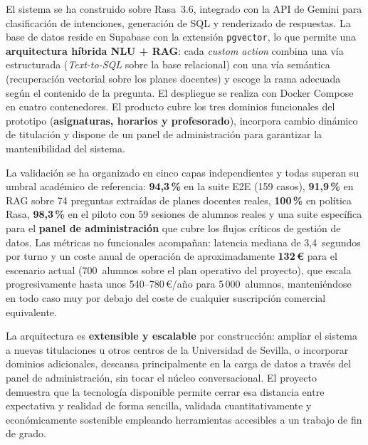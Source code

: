 El sistema se ha construido sobre Rasa~3.6, integrado con la API de Gemini para clasificación de intenciones, generación de SQL y renderizado de respuestas. La base de datos reside en Supabase con la extensión \texttt{pgvector}, lo que permite una \textbf{arquitectura híbrida NLU + RAG}: cada \textit{custom action} combina una vía estructurada (\textit{Text-to-SQL} sobre la base relacional) con una vía semántica (recuperación vectorial sobre los planes docentes) y escoge la rama adecuada según el contenido de la pregunta. El despliegue se realiza con Docker Compose en cuatro contenedores. El producto cubre los tres dominios funcionales del prototipo (\textbf{asignaturas, horarios y profesorado}), incorpora cambio dinámico de titulación y dispone de un panel de administración para garantizar la mantenibilidad del sistema.

La validación se ha organizado en cinco capas independientes y todas superan su umbral académico de referencia: \textbf{94,3\,\%} en la suite E2E (159 casos), \textbf{91,9\,\%} en RAG sobre 74 preguntas extraídas de planes docentes reales, \textbf{100\,\%} en política Rasa, \textbf{98,3\,\%} en el piloto con 59 sesiones de alumnos reales y una suite específica para el \textbf{panel de administración} que cubre los flujos críticos de gestión de datos. Las métricas no funcionales acompañan: latencia mediana de 3,4~segundos por turno y un coste anual de operación de aproximadamente \textbf{132\,€} para el escenario actual (700~alumnos sobre el plan operativo del proyecto), que escala progresivamente hasta unos 540--780\,€/año para 5\,000~alumnos, manteniéndose en todo caso muy por debajo del coste de cualquier suscripción comercial equivalente.

La arquitectura es \textbf{extensible y escalable} por construcción: ampliar el sistema a nuevas titulaciones u otros centros de la Universidad de Sevilla, o incorporar dominios adicionales, descansa principalmente en la carga de datos a través del panel de administración, sin tocar el núcleo conversacional. El proyecto demuestra que la tecnología disponible permite cerrar esa distancia entre expectativa y realidad de forma sencilla, validada cuantitativamente y económicamente sostenible empleando herramientas accesibles a un trabajo de fin de grado.

\clearpage

\titlespacing*{\chapter}{0pt}{-30pt}{15pt}
